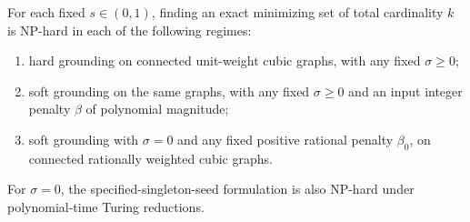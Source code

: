 \begin{theorem}\label{thm:hardness}
For each fixed $s\in(0,1)$, finding an exact minimizing set of total
cardinality $k$ is NP-hard in each of the following regimes:
\begin{enumerate}
\item hard grounding on connected unit-weight cubic graphs, with any
fixed $\sigma\geq0$;
\item soft grounding on the same graphs, with any fixed $\sigma\geq0$
and an input integer penalty $\beta$ of polynomial magnitude;
\item soft grounding with $\sigma=0$ and any fixed positive rational
penalty $\beta_0$, on connected rationally weighted cubic graphs.
\end{enumerate}
For $\sigma=0$, the specified-singleton-seed formulation is also
NP-hard under polynomial-time Turing reductions.
\end{theorem}
